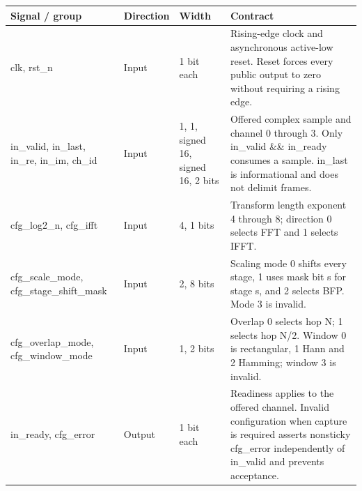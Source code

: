 \documentclass[11pt,a4paper]{article}
\begin{document}
{\small\renewcommand{\arraystretch}{1.18}\begin{longtable}{@{}L{0.21\textwidth}|L{0.12\textwidth}|L{0.12\textwidth}|L{0.45\textwidth}@{}}\toprule

\textbf{Signal /\allowbreak{} group} & \textbf{Direction} & \textbf{Width} & \textbf{Contract}\\\midrule\endhead

clk,\allowbreak{} rst\_\allowbreak{}n & Input & 1 bit each & Rising-edge clock and asynchronous active-low reset. Reset forces every public output to zero without requiring a rising edge.\\[2pt]\hline

in\_\allowbreak{}valid,\allowbreak{} in\_\allowbreak{}last,\allowbreak{} in\_\allowbreak{}re,\allowbreak{} in\_\allowbreak{}im,\allowbreak{} ch\_\allowbreak{}id & Input & 1,\allowbreak{} 1,\allowbreak{} signed 16,\allowbreak{} signed 16,\allowbreak{} 2 bits & Offered complex sample and channel 0 through 3. Only in\_\allowbreak{}valid \&\& in\_\allowbreak{}ready consumes a sample. in\_\allowbreak{}last is informational and does not delimit frames.\\[2pt]\hline

cfg\_\allowbreak{}log2\_\allowbreak{}n,\allowbreak{} cfg\_\allowbreak{}ifft & Input & 4,\allowbreak{} 1 bits & Transform length exponent 4 through 8; direction 0 selects FFT and 1 selects IFFT.\\[2pt]\hline

cfg\_\allowbreak{}scale\_\allowbreak{}mode,\allowbreak{} cfg\_\allowbreak{}stage\_\allowbreak{}shift\_\allowbreak{}mask & Input & 2,\allowbreak{} 8 bits & Scaling mode 0 shifts every stage,\allowbreak{} 1 uses mask bit s for stage s,\allowbreak{} and 2 selects BFP. Mode 3 is invalid.\\[2pt]\hline

cfg\_\allowbreak{}overlap\_\allowbreak{}mode,\allowbreak{} cfg\_\allowbreak{}window\_\allowbreak{}mode & Input & 1,\allowbreak{} 2 bits & Overlap 0 selects hop N; 1 selects hop N/\allowbreak{}2. Window 0 is rectangular,\allowbreak{} 1 Hann and 2 Hamming; window 3 is invalid.\\[2pt]\hline

in\_\allowbreak{}ready,\allowbreak{} cfg\_\allowbreak{}error & Output & 1 bit each & Readiness applies to the offered channel. Invalid configuration when capture is required asserts nonsticky cfg\_\allowbreak{}error independently of in\_\allowbreak{}valid and prevents acceptance.\\[2pt]\hline


\end{longtable}}
\end{document}
